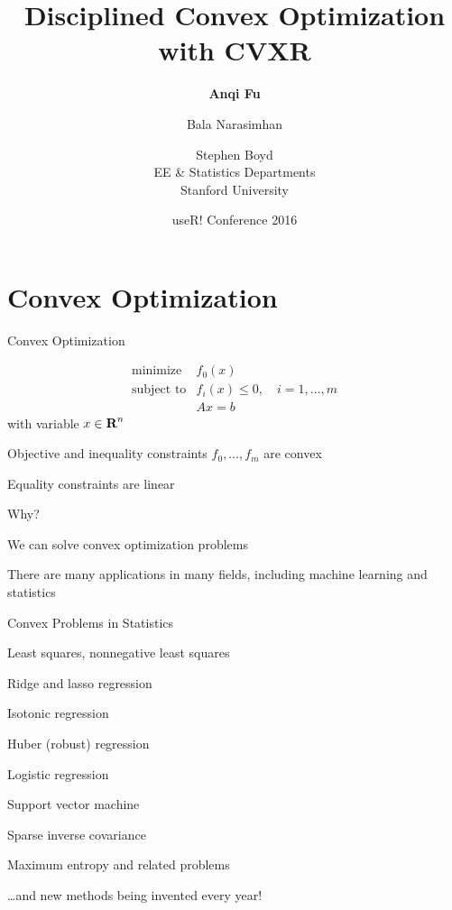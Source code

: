 \documentclass{beamer}
\title{Disciplined Convex Optimization with CVXR}
\author{\textbf{Anqi Fu} \and Bala Narasimhan \and Stephen Boyd \\[2ex]
	EE \& Statistics Departments\\[1ex]
	Stanford University}
\date{useR! Conference 2016}
\begin{document}
	
\begin{frame}
	\titlepage
\end{frame}

\begin{frame}
	\tableofcontents
\end{frame}

\section{Convex Optimization}

\begin{frame}{Convex Optimization}%
	
	\[
	\begin{array}{ll} \mbox{minimize} & f_0(x)\\
	\mbox{subject to} & f_i(x) \leq 0, \quad i=1, \ldots, m\\
	& Ax=b
	\end{array}
	\]
	with variable $x \in {\mbox{\bf R}}^n$
	
	\BIT
		\item Objective and inequality constraints $f_0, \ldots, f_m$ are convex %
		\item Equality constraints are linear
	\EIT
	\pause
	
	\vfill
	Why?
	\BIT
		\item We can solve convex optimization problems
		\item There are many applications in many fields, including machine learning and statistics
	\EIT
	
\end{frame}

\begin{frame}{Convex Problems in Statistics}
	\BIT
		\item Least squares, nonnegative least squares
		\item Ridge and lasso regression
		\item Isotonic regression
		\item Huber (robust) regression
		\item Logistic regression
		\item Support vector machine
		\item Sparse inverse covariance
		\item Maximum entropy and related problems
		\item \ldots and new methods being invented every year!
	\EIT
\end{frame}
\end{document}
